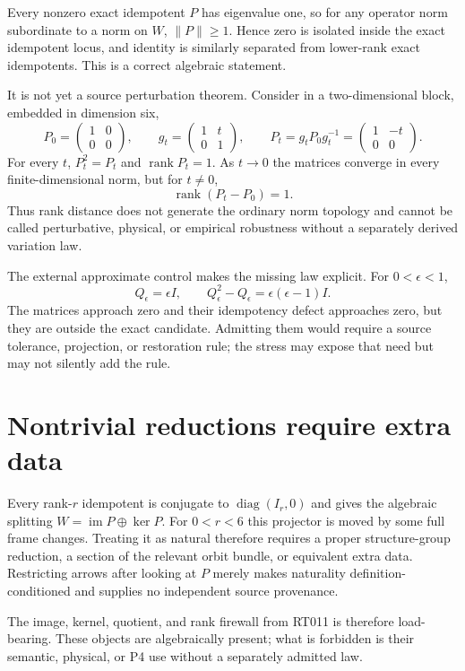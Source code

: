\documentclass[11pt]{article}
\newcommand{\im}{\operatorname{im}}
\newcommand{\rank}{\operatorname{rank}}
\begin{document}
Every nonzero exact idempotent $P$ has eigenvalue one, so for any operator norm
subordinate to a norm on $W$, $\lVert P\rVert\ge 1$.  Hence zero is isolated
inside the exact idempotent locus, and identity is similarly separated from
lower-rank exact idempotents.  This is a correct algebraic statement.

It is not yet a source perturbation theorem.  Consider in a two-dimensional
block, embedded in dimension six,
\[
  P_0=\begin{pmatrix}1&0\\0&0\end{pmatrix},\qquad
  g_t=\begin{pmatrix}1&t\\0&1\end{pmatrix},\qquad
  P_t=g_tP_0g_t^{-1}=\begin{pmatrix}1&-t\\0&0\end{pmatrix}.
\]
For every $t$, $P_t^2=P_t$ and $\rank P_t=1$.  As $t\to0$ the matrices
converge in every finite-dimensional norm, but for $t\ne0$,
\[
  \rank(P_t-P_0)=1.
\]
Thus rank distance does not generate the ordinary norm topology and cannot be
called perturbative, physical, or empirical robustness without a separately
derived variation law.

The external approximate control makes the missing law explicit.  For
$0<\epsilon<1$,
\[
 Q_\epsilon=\epsilon I,\qquad
 Q_\epsilon^2-Q_\epsilon=\epsilon(\epsilon-1)I.
\]
The matrices approach zero and their idempotency defect approaches zero, but
they are outside the exact candidate.  Admitting them would require a source
tolerance, projection, or restoration rule; the stress may expose that need
but may not silently add the rule.

\section{Nontrivial reductions require extra data}

Every rank-$r$ idempotent is conjugate to
$\operatorname{diag}(I_r,0)$ and gives the algebraic splitting
$W=\im P\oplus\ker P$.  For $0<r<6$ this projector is moved by some full frame
changes.  Treating it as natural therefore requires a proper structure-group
reduction, a section of the relevant orbit bundle, or equivalent extra data.
Restricting arrows after looking at $P$ merely makes naturality
definition-conditioned and supplies no independent source provenance.

The image, kernel, quotient, and rank firewall from RT011 is therefore
load-bearing.  These objects are algebraically present; what is forbidden is
their semantic, physical, or P4 use without a separately admitted law.
\end{document}
